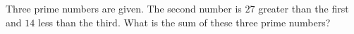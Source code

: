 Three prime numbers are given. The second number is $27$ greater than the first and $14$ less than the third. What is the sum of these three prime numbers?
